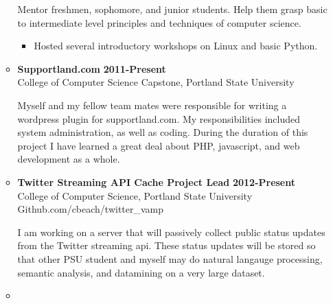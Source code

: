 \documentclass[overlapped]{res}
\begin{document}
\begin{resume}
\begin{itemize}[leftmargin=0in]
\begin{itemize}[leftmargin=0in]
\begin{samepage}
                    Mentor freshmen, sophomore, and junior students. Help them grasp basic to intermediate level
                    principles and techniques of computer science.	
                    \begin{itemize}
                        \item[\textbullet] Hosted several introductory workshops on Linux and basic Python.
                    \end{itemize}
                \end{samepage}

            \item[] 
                \begin{samepage}
                    \textbf{Supportland.com} \hfill \textbf{2011-Present} \\
                    College of Computer Science Capstone, Portland State University \hfill

                    Myself and my fellow team mates were responsible for writing a wordpress plugin 
                    for supportland.com. My responsibilities included system administration, as 
                    well as coding. During the duration of this project I have learned a great
                    deal about PHP, javascript, and web development as a whole.
                \end{samepage}

            \item[] 
                \begin{samepage}

                    \textbf{Twitter Streaming API Cache Project Lead} \hfill \textbf{2012-Present} \\
                    College of Computer Science, Portland State University \\
                    Github.com/cbeach/twitter\_vamp 

                    I am working on a server that will passively collect public status updates from the
                    Twitter streaming api. These status updates will be stored so that other PSU student
                    and myself may do natural langauge processing, semantic analysis, and datamining on
                    a very large dataset.				
                \end{samepage}

            \item[] 
                \begin{samepage}


\end{samepage}
\end{itemize}
\end{itemize}
\end{resume}
\end{document}
